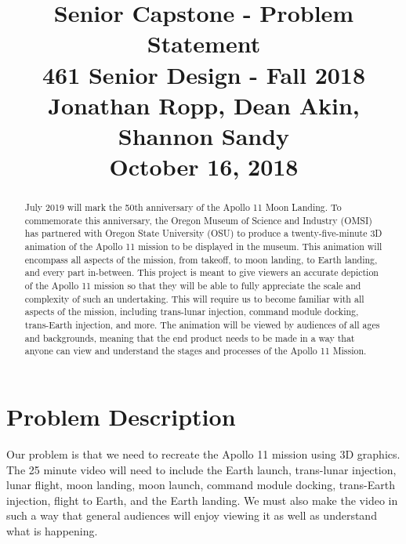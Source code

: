 \documentclass[onecolumn, draftclsnofoot,10pt, compsoc]{IEEEtran}
\begin{document}
\title{Senior Capstone - Problem Statement\\
	\large 461 Senior Design - Fall 2018\\
	\large Jonathan Ropp, Dean Akin, Shannon Sandy\\
	\large October 16, 2018}

\maketitle

\begin{abstract}

July 2019 will mark the 50th anniversary of the Apollo 11 Moon Landing. To commemorate this anniversary, the Oregon Museum of Science and Industry (OMSI) has partnered with Oregon State University (OSU) to produce a twenty-five-minute 3D animation of the Apollo 11 mission to be displayed in the museum. This animation will encompass all aspects of the mission, from takeoff, to moon landing, to Earth landing, and every part in-between. This project is meant to give viewers an accurate depiction of the Apollo 11 mission so that they will be able to fully appreciate the scale and complexity of such an undertaking. This will require us to become familiar with all aspects of the mission, including trans-lunar injection, command module docking, trans-Earth injection, and more. The animation will be viewed by audiences of all ages and backgrounds, meaning that the end product needs to be made in a way that anyone can view and understand the stages and processes of the Apollo 11 Mission.

\end{abstract}

\newpage

\section{Problem Description}
Our problem is that we need to recreate the Apollo 11 mission using 3D graphics. The 25 minute video will need to include the Earth launch, trans-lunar injection, lunar flight, moon landing, moon launch, command module docking, trans-Earth injection, flight to Earth, and the Earth landing. We must also make the video in such a way that general audiences will enjoy viewing it as well as understand what is happening.
\end{document}
